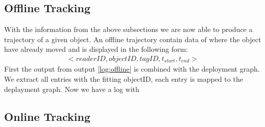 \subsection{Offline Tracking}
\label{sub:offline}
With the information from the above subsections we are now able to produce a trajectory of a given object.
An offline trajectory contain data of where the object have already moved and is displayed in the following form:
\begin{align}
<readerID,objectID,tagID,t_{start},t_{end}>
\end{align}
First the output from output \ref{log:offline} is combined with the deployment graph.
We extract all entries with the fitting objectID, each entry is mapped to the deplayment graph.
Now we have a log with     


\subsection{Online Tracking}
\label{sub:online}

